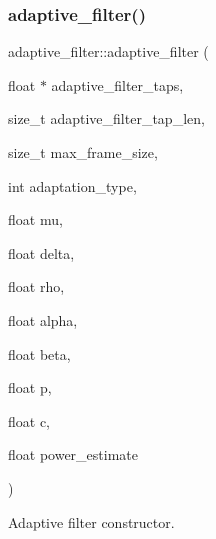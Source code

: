 \subsubsection{\texorpdfstring{adaptive\+\_\+filter()}{adaptive\_filter()}}
{\footnotesize\ttfamily adaptive\+\_\+filter\+::adaptive\+\_\+filter (\begin{DoxyParamCaption}\item[{float $\ast$}]{adaptive\+\_\+filter\+\_\+taps,  }\item[{size\+\_\+t}]{adaptive\+\_\+filter\+\_\+tap\+\_\+len,  }\item[{size\+\_\+t}]{max\+\_\+frame\+\_\+size,  }\item[{int}]{adaptation\+\_\+type,  }\item[{float}]{mu,  }\item[{float}]{delta,  }\item[{float}]{rho,  }\item[{float}]{alpha,  }\item[{float}]{beta,  }\item[{float}]{p,  }\item[{float}]{c,  }\item[{float}]{power\+\_\+estimate }\end{DoxyParamCaption})\hspace{0.3cm}{\ttfamily [explicit]}}



Adaptive filter constructor. 



